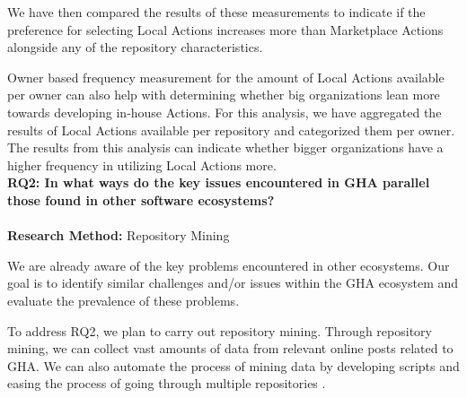 \documentclass[conference]{IEEEtran}
\begin{document}
	We have then compared the results of these measurements to indicate if the preference for selecting Local Actions increases more than Marketplace Actions alongside any of the repository characteristics.

            Owner based frequency measurement for the amount of Local Actions available per owner can also help with determining whether big organizations lean more towards developing in-house Actions. For this analysis, we have aggregated the results of Local Actions available per repository and categorized them per owner. The results from this analysis can indicate whether bigger organizations have a higher frequency in utilizing Local Actions more. \\

        \textbf{RQ2: In what ways do the key issues encountered in GHA parallel those found in other software ecosystems?}\\\\
            \textbf{Research Method:} Repository Mining

            We are already aware of the key problems encountered in other ecosystems. Our goal is to identify similar challenges and/or issues within the GHA ecosystem and evaluate the prevalence of these problems.

            To address RQ2, we plan to carry out repository mining. Through repository mining, we can collect vast amounts of data from relevant online posts related to GHA. We can also automate the process of mining data by developing scripts\cite{Marof2024}  and easing the process of going through multiple repositories \cite{chaturvedi2013tools}.\\
\end{document}
